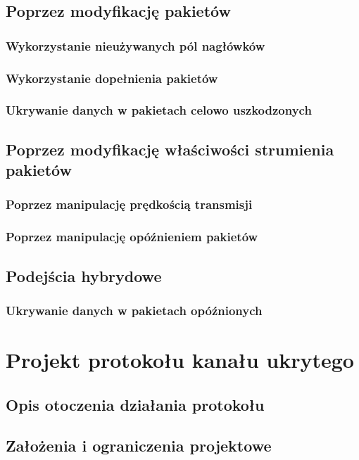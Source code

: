 \documentclass[a4paper]{report}
\begin{document}
    \section{Poprzez modyfikację pakietów}
        \subsection{Wykorzystanie nieużywanych pól nagłówków}
        \subsection{Wykorzystanie dopełnienia pakietów}
        \subsection{Ukrywanie danych w pakietach celowo uszkodzonych}

    \section{Poprzez modyfikację właściwości strumienia pakietów}
        \subsection{Poprzez manipulację prędkością transmisji}
        \subsection{Poprzez manipulację opóźnieniem pakietów}

    \section{Podejścia hybrydowe}
        \subsection{Ukrywanie danych w pakietach opóźnionych}


\chapter{Projekt protokołu kanału ukrytego}
    \section{Opis otoczenia działania protokołu}
    \section{Założenia i ograniczenia projektowe}
\end{document}
